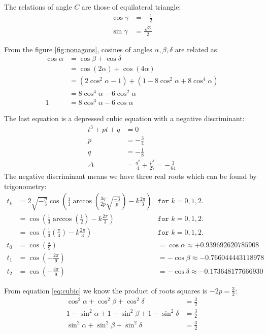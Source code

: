 \documentclass[11pt]{article}
\begin{document}
The relations of angle $C$ are those of equilateral triangle:
\begin{align}
\cos\gamma &= -\frac{1}{2}\\
\sin\gamma &= \frac{\sqrt{3}}{2}
\end{align}

From the figure \ref{fig:nonagons}, cosines of angles $\alpha, \beta, \delta$ are related as:
\begin{align}
\cos\alpha &= \cos\beta + \cos\delta \label{eq:cosines-alpha-beta-delta-sum} \\
 &= \cos(2\alpha) + \cos(4\alpha) \nonumber\\
 &= (2\cos^2\alpha - 1) + (1 -8\cos^2\alpha + 8\cos^4\alpha) \nonumber\\
 &= 8\cos^4\alpha - 6\cos^2\alpha \nonumber\\
 1 &= 8\cos^3\alpha - 6\cos\alpha
\end{align}

The last equation is a depressed cubic equation with a negative discriminant:
\begin{align}
t^3 +pt +q &= 0 \label{eq:cubic}\\
p &= -\frac{3}{4}\\
q &= -\frac{1}{8}\\
\Delta &= \frac{q^2}{4} + \frac{p^3}{27} = -\frac{3}{64} \nonumber
\end{align}
The negative discriminant means we have three real roots which can be found by trigonometry:
\begin{align}
t_k &= 2\sqrt{-\frac{p}{3}}\cos\left({\frac{1}{3}\arccos\left(
\frac{3q}{2p}\sqrt{\frac{-3}{p}}
\right) -k\frac{2\pi}{3}}\right) &\texttt{for } k=0,1,2. \nonumber\\
&= \cos\left(\frac{1}{3}\arccos\left(\frac{1}{2}\right) -k\frac{2\pi}{3} \right)  &\texttt{for } k=0,1,2. \nonumber\\
&= \cos\left(\frac{1}{3}\left(\frac{\pi}{3}\right) -k\frac{2\pi}{3} \right)  &\texttt{for } k=0,1,2. \nonumber\\
t_0 &= \cos\left(\frac{\pi}{9}\right)   &= \cos\alpha \approx +0.939692620785908\\
t_1 &= \cos\left(-\frac{2\pi}{9}\right) &= -\cos\beta \approx -0.766044443118978 \\
t_2 &= \cos\left(-\frac{4\pi}{9}\right) &= -\cos\delta \approx -0.173648177666930
\end{align}

From equation \ref{eq:cubic} we know the product of roots squares is $-2p = \frac{3}{2}$:
\begin{align}
\cos^2\alpha + \cos^2\beta + \cos^2\delta &= \frac{3}{2} \\
1 - \sin^2\alpha + 1 - \sin^2\beta + 1 - \sin^2\delta &= \frac{3}{2} \nonumber\\
\sin^2\alpha + \sin^2\beta + \sin^2\delta &= \frac{3}{2}
\end{align}
\end{document}
